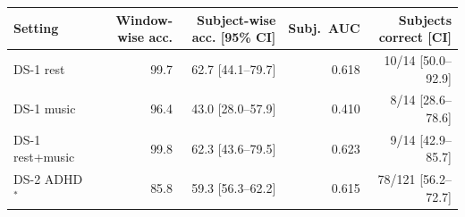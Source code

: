 \small
\begin{tabular}{lrrrr}
\hline
Setting & Window-wise acc. & Subject-wise acc. [95\% CI] & Subj.\ AUC & Subjects correct [CI] \\
\hline
DS-1 rest & 99.7 & 62.7 [44.1--79.7] & 0.618 & 10/14 [50.0--92.9] \\
DS-1 music & 96.4 & 43.0 [28.0--57.9] & 0.410 & 8/14 [28.6--78.6] \\
DS-1 rest+music & 99.8 & 62.3 [43.6--79.5] & 0.623 & 9/14 [42.9--85.7] \\
DS-2 ADHD$^\ast$ & 85.8 & 59.3 [56.3--62.2] & 0.615 & 78/121 [56.2--72.7] \\
\hline
\end{tabular}
